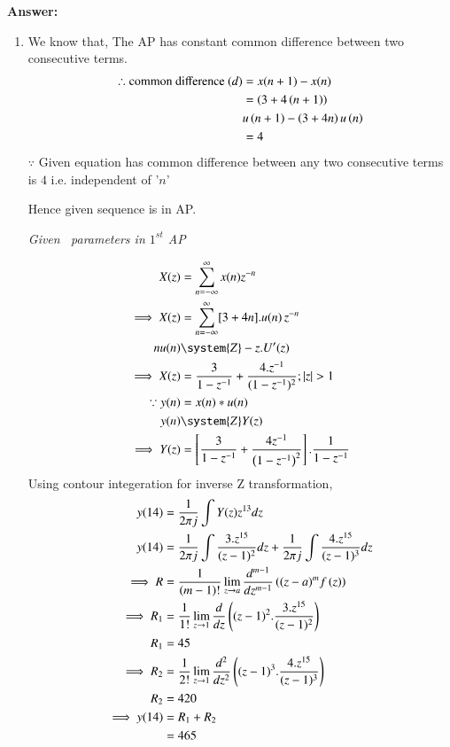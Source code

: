 \documentclass[journal,12pt,twocolumn]{IEEEtran}
\theoremstyle{remark}
\begin{document}
\vspace{0.5cm}
\textbf{Answer:} 
\begin{enumerate} [label=(\roman*)]
    \item We know that, The AP has constant common difference between two consecutive terms.
    \begin{align}
        \therefore \text{common difference } (d) &= x(n+1) - x(n) \\
        &= \left(3+4\left(n+1\right)\right) \nonumber\\
        & u\left(n+1\right) -\left(3+4n\right)u\left(n\right) \nonumber\\
        &= 4
    \end{align}
   $\because$ Given equation has common difference between any two consecutive terms is $4$ i.e. independent of '$n$'
   \begin{center}
       Hence given sequence is in AP.
   \end{center}
    \begin{table}[htbp] 
    \centering
    
    \caption{\normalsize\textsl{Given \, parameters in $1^{st}$ AP}}
    \label{given parameters list}
    \end{table}

    \begin{align}
         X(z) &= \sum_{n = -\infty}^{\infty} x(n) z^{-n} \label{eq:z-transform}\\
        \implies  X(z) &= \sum_{n = -\infty}^{\infty}[3 + 4n].u(n) \, z^{-n} \\
        nu(n) &\system{Z} -z.U'(z)\\
        \implies X(z) &= \dfrac{3}{1-z^{-1}} + \dfrac{4.z^{-1}}{(1-z^{-1})^2} ; |z|>1\\
        \because y(n) &= x(n) * u(n)\\
        y(n) &\system{Z} Y(z) \nonumber\\
        \implies Y(z) &= \left[ \dfrac{3}{1-z^{-1}} + \dfrac{4 z^{-1}}{\left(1-z^{-1}\right)^2} \right].\dfrac{1}{1-z^{-1}}
    \end{align}
    Using contour integeration for inverse Z transformation,\\
    \begin{align}
        y(14) &= \dfrac{1}{2\pi j}\int Y(z) z^{13} dz \\
        y(14) &= \dfrac{1}{2\pi j}\int \dfrac{3.z^{15}}{(z-1)^{2}} dz + \dfrac{1}{2\pi j}\int \dfrac{4.z^{15}}{(z-1)^{3}} dz\\
        \implies R&=\dfrac{1}{\left(m-1\right)!}\lim\limits_{z\to a}\dfrac{d^{m-1}}{dz^{m-1}}\left({(z-a)}^{m}f\left(z\right)\right)\\
        \implies R_1 &=\dfrac{1}{1!}\lim\limits_{z\to 1}\dfrac{d}{dz}\left((z-1)^2.\dfrac{3.z^{15}}{(z-1)^{2}}\right)\\
        R_1 &= 45\\
        \implies R_2 &=\dfrac{1}{2!}\lim\limits_{z\to 1}\dfrac{d^2}{dz^2}\left((z-1)^3.\dfrac{4.z^{15}}{(z-1)^{3}}\right)\\
        R_2 &= 420\\
        \implies y(14) &= R_1 + R_2 \nonumber\\
        &= 465
    \end{align}
    

\end{enumerate}
\end{document}
